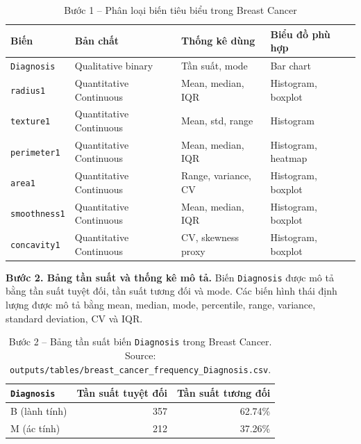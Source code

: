 \begin{table}[H]
\centering
\caption{Bước 1 -- Phân loại biến tiêu biểu trong Breast Cancer}
\label{tab:ch4_breast_variable_types}
\small
\begin{tabularx}{\textwidth}{p{}p{}p{}Y}
\toprule
Biến & Bản chất & Thống kê dùng & Biểu đồ phù hợp \\
\midrule
\texttt{Diagnosis} & Qualitative binary & Tần suất, mode & Bar chart \\
\texttt{radius1} & Quantitative Continuous & Mean, median, IQR & Histogram, boxplot \\
\texttt{texture1} & Quantitative Continuous & Mean, std, range & Histogram \\
\texttt{perimeter1} & Quantitative Continuous & Mean, median, IQR & Histogram, heatmap \\
\texttt{area1} & Quantitative Continuous & Range, variance, CV & Histogram, boxplot \\
\texttt{smoothness1} & Quantitative Continuous & Mean, median, IQR & Histogram, boxplot \\
\texttt{concavity1} & Quantitative Continuous & CV, skewness proxy & Histogram, boxplot \\
\bottomrule
\end{tabularx}
\end{table}

\textbf{Bước 2. Bảng tần suất và thống kê mô tả.} Biến \texttt{Diagnosis} được mô tả bằng tần suất tuyệt đối, tần suất tương đối và mode. Các biến hình thái định lượng được mô tả bằng mean, median, mode, percentile, range, variance, standard deviation, CV và IQR.

\begin{table}[H]
\centering
\caption[Bảng tần suất \texttt{Diagnosis} trong Breast Cancer]{Bước 2 -- Bảng tần suất biến \texttt{Diagnosis} trong Breast Cancer. Source: \texttt{outputs/tables/breast\_cancer\_frequency\_Diagnosis.csv}.}
\label{tab:ch4_breast_frequency}
\small
\begin{tabular}{lrr}
\toprule
\texttt{Diagnosis} & Tần suất tuyệt đối & Tần suất tương đối \\
\midrule
B (lành tính) & 357 & 62.74\% \\
M (ác tính) & 212 & 37.26\% \\
\bottomrule
\end{tabular}
\end{table}

